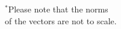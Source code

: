 \documentclass[preview]{standalone}
\begin{document}
\begin{center}
$^*$Please note that the norms \\ of the vectors are not to scale.
\end{center}
\end{document}
